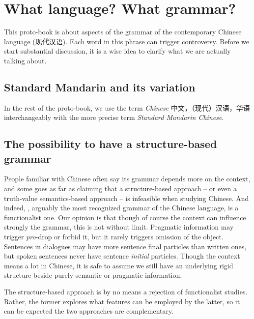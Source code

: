 \documentclass[../main.tex]{subfiles}
\begin{document}
\section{What language? What grammar?}

This proto-book is about aspects of the grammar of the contemporary Chinese language (现代汉语). 
Each word in this phrase can trigger controversy. Before we start substantial discussion, it is a wise idea 
to clarify what we are actually talking about. 

\subsection{Standard Mandarin and its variation}


In the rest of the proto-book, we use the term \emph{Chinese} 中文，（现代）汉语，华语 interchangeably with 
the more precise term \emph{Standard Mandarin Chinese}.

\subsection{The possibility to have a structure-based grammar}

People familiar with Chinese often say its grammar depends more on the context, and some goes as far as 
claiming that a structure-based approach -- or even a truth-value semantics-based approach -- is infeasible 
when studying Chinese. And indeed, \citet{li1989mandarin}, arguably the most recognized grammar of the Chinese 
language, is a functionalist one. Our opinion is that though of course the context can influence strongly the 
grammar, this is not without limit. Pragmatic information may trigger \emph{pro}-drop or forbid it, but it 
rarely triggers omission of the object. Sentences in dialogues may have more sentence final particles than 
written ones, but spoken sentences never have sentence \emph{initial} particles. Though the context means 
a lot in Chinese, it is safe to assume we still have an underlying rigid structure beside purely semantic 
or pragmatic information.

The structure-based approach is by no means a rejection of functionalist studies. Rather, the former explores 
what features can be employed by the latter, so it can be expected the two approaches are complementary.
\end{document}
